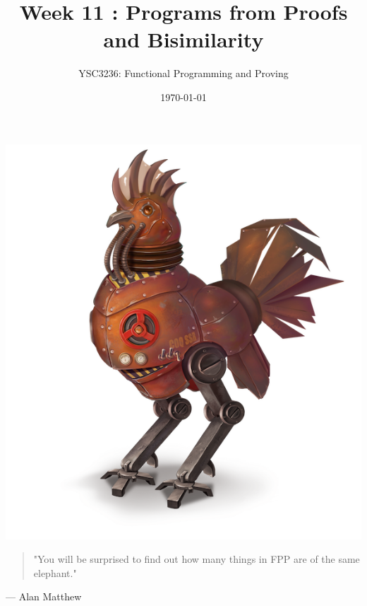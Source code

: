 \documentclass{article}
\title{
        \fontfamily{ebgaramond}\selectfont Week 11 : Programs from Proofs and Bisimilarity \\
    \vspace{1cm}
}
\author{YSC3236: Functional Programming and Proving}
\date{%
    \vspace{1cm}
    \today
}
\begin{document}
\maketitle

\begin{center}
  \includegraphics[width=14cm]{logo.png}    
\end{center}

\begin{quote}
  "You will be surprised to find out how many things in FPP are of the same elephant."
\end{quote}
\hfill--- Alan Matthew


\newpage
\end{document}
